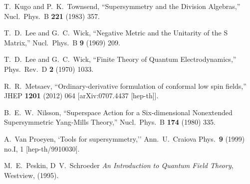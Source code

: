 \begin{thebibliography}{99}
   

  T.~Kugo and P.~K.~Townsend,
  ``Supersymmetry and the Division Algebras,''
  Nucl.\ Phys.\ B {\bf 221} (1983) 357.
  



  T.~D.~Lee and G.~C.~Wick,
  ``Negative Metric and the Unitarity of the S Matrix,''
  Nucl.\ Phys.\ B {\bf 9} (1969) 209.
  
  
  T.~D.~Lee and G.~C.~Wick,
  ``Finite Theory of Quantum Electrodynamics,''
  Phys.\ Rev.\ D {\bf 2} (1970) 1033.
  
  R.~R.~Metsaev,
  ``Ordinary-derivative formulation of conformal low spin fields,''
  JHEP {\bf 1201} (2012) 064
  [arXiv:0707.4437 [hep-th]].
  


  B.~E.~W.~Nilsson,
  ``Superspace Action for a Six-dimensional Nonextended Supersymmetric {Yang-Mills} Theory,''
  Nucl.\ Phys.\ B {\bf 174} (1980) 335.


  A.~Van Proeyen,
  `Tools for supersymmetry,''
  Ann.\ U.\ Craiova Phys.\  {\bf 9} (1999) no.I,  1
  [hep-th/9910030].
  
  
  
   M.~E.~Peskin, D~V.~Schroeder {\em An Introduction to Quantum Field Theory}, Westview,
(1995).  


  

\end{thebibliography}
